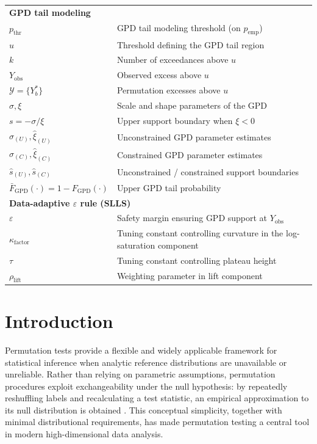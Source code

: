 \begin{table}[H]
\begin{tabularx}{\textwidth}{lX}
\multicolumn{2}{l}{\textbf{GPD tail modeling}} \\[2pt]
$p_{\mathrm{thr}}$ & GPD tail modeling threshold (on $p_{\mathrm{emp}}$) \\
$u$ & Threshold defining the GPD tail region \\
$k$ & Number of exceedances above $u$\\
$Y_{\text{obs}}$ & Observed excess above $u$ \\
$\mathcal{Y} = \{Y_b^*\}$ & Permutation excesses above $u$ \\
$\sigma, \xi$ & Scale and shape parameters of the GPD \\
$s = -\sigma/\xi$ & Upper support boundary when $\xi < 0$ \\
$\hat{\sigma}_{(U)}, \hat{\xi}_{(U)}$ & Unconstrained GPD parameter estimates \\
$\hat{\sigma}_{(C)}, \hat{\xi}_{(C)}$ & Constrained GPD parameter estimates \\
$\hat{s}_{(U)}, \hat{s}_{(C)}$ & Unconstrained / constrained support boundaries \\
$\bar{F}_{\mathrm{GPD}}(\cdot) = 1 - F_{\mathrm{GPD}}(\cdot)$ & Upper GPD tail probability\\
\midrule

\multicolumn{2}{l}{\textbf{Data-adaptive $\varepsilon$ rule (SLLS)}} \\[2pt]
$\varepsilon$ & Safety margin ensuring GPD support at $Y_{\text{obs}}$
\\
$\kappa_{\mathrm{factor}}$ & Tuning constant controlling curvature in the log-saturation component\\
$\tau$ & Tuning constant controlling plateau height \\
$\rho_{\mathrm{lift}}$ & Weighting parameter in lift component \\
\bottomrule
\end{tabularx}
\end{table}

\section{Introduction}
\label{sec:6perm:introduction}

Permutation tests provide a flexible and widely applicable framework for statistical inference when analytic reference distributions are unavailable or unreliable. 
Rather than relying on parametric assumptions, permutation procedures exploit exchangeability under the null hypothesis: by repeatedly reshuffling labels and recalculating a test statistic, an empirical approximation to its null distribution is obtained \citep{fisher1935design,pitman1937significance,good2005permutation}. 
This conceptual simplicity, together with minimal distributional requirements, has made permutation testing a central tool in modern high-dimensional data analysis.

